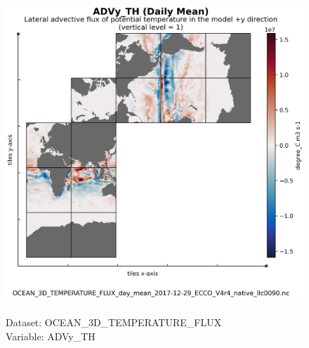 \begin{figure}[H]
\centering
\includegraphics[scale=0.5]{../images/plots/native_plots/Ocean_Three-Dimensional_Potential_Temperature_Fluxes/ADVy_TH.png}
\caption{\\Dataset: OCEAN\_3D\_TEMPERATURE\_FLUX\\Variable: ADVy\_TH}
\label{tab:table-OCEAN_3D_TEMPERATURE_FLUX_ADVy_TH-Plot}
\end{figure}
\pagebreak
